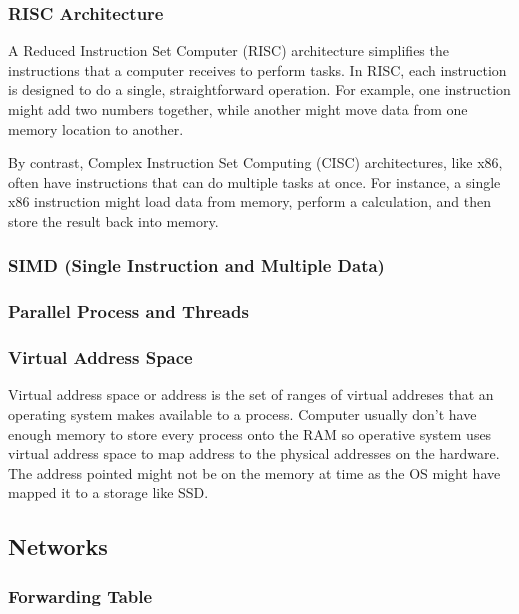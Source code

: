 \documentclass[11pt]{article}
\begin{document}
\subsubsection{RISC Architecture}

A Reduced Instruction Set Computer (RISC) architecture simplifies the
instructions that a computer receives to perform tasks. In RISC, each
instruction is designed to do a single, straightforward operation. For example,
one instruction might add two numbers together, while another might move data
from one memory location to another.\cite{wiki:risc}

By contrast, Complex Instruction Set Computing (CISC) architectures, like x86,
often have instructions that can do multiple tasks at once. For instance, a
single x86 instruction might load data from memory, perform a calculation, and
then store the result back into memory.

\subsubsection{SIMD (Single Instruction and Multiple Data)}

\subsubsection{Parallel Process and Threads}

\subsubsection{Virtual Address Space}

Virtual address space or address is the set of ranges of virtual addreses that
an operating system makes available to a process.\cite{wiki:vas} Computer
usually don't have enough memory to store every process onto the RAM so
operative system uses virtual address space to map address to the physical
addresses on the hardware. The address pointed might not be on the memory at
time as the OS might have mapped it to a storage like SSD.\cite{vid:vas}


\subsection{Networks}

\subsubsection{Forwarding Table}
\end{document}

